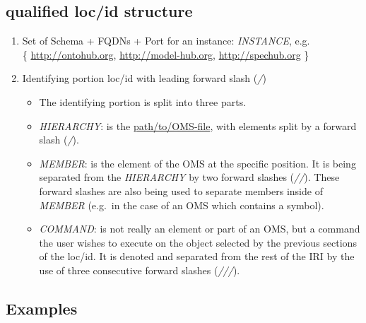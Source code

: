 \documentclass[10pt,fleqn,final]{scrreprt}
\begin{document}
\subsection{qualified loc/id structure}

\begin{enumerate}
  \item Set of Schema + FQDNs + Port for an instance: \emph{INSTANCE}, e.g.\\
    \{ \url{http://ontohub.org}, \url{http://model-hub.org}, \url{http://spechub.org} \}
  \item Identifying portion loc/id with leading forward slash (\emph{/})
  \begin{itemize}
    \item The identifying portion is split into three parts.
    \item \emph{HIERARCHY}: is the \url{path/to/OMS-file}, with elements
      split by a forward slash (\emph{/}).
    \item \emph{MEMBER}: is the element of the OMS at the specific
      position. It is being separated from the \emph{HIERARCHY} by two
      forward slashes (\emph{//}). These forward slashes are also being used to
      separate members inside of \emph{MEMBER} (e.g.\ in the case of an
      OMS which contains a symbol).
    \item \emph{COMMAND}: is not really an element or part of an OMS,
      but a command the user wishes to execute on the object selected by the
      previous sections of the loc/id. It is denoted and separated from the
      rest of the IRI by the use of three consecutive forward slashes
      (\emph{///}).
  \end{itemize}
\end{enumerate}

\subsection{Examples}
\end{document}
